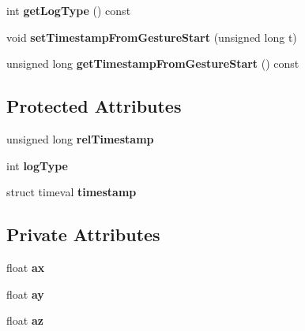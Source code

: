 \begin{DoxyCompactItemize}
\item 
\hypertarget{class_sample_aafff0e8223f3eafa001611a63f194c8a}{int {\bfseries get\-Log\-Type} () const }\label{class_sample_aafff0e8223f3eafa001611a63f194c8a}

\item 
\hypertarget{class_sample_a05edd06782fa94517b8daeb29e12057d}{void {\bfseries set\-Timestamp\-From\-Gesture\-Start} (unsigned long t)}\label{class_sample_a05edd06782fa94517b8daeb29e12057d}

\item 
\hypertarget{class_sample_a94a34fe92c0f8a89485042aaea458d94}{unsigned long {\bfseries get\-Timestamp\-From\-Gesture\-Start} () const }\label{class_sample_a94a34fe92c0f8a89485042aaea458d94}

\end{DoxyCompactItemize}
\subsection*{Protected Attributes}
\begin{DoxyCompactItemize}
\item 
\hypertarget{class_sample_a24ea733ab0a815949a57aca2a4740e33}{unsigned long {\bfseries rel\-Timestamp}}\label{class_sample_a24ea733ab0a815949a57aca2a4740e33}

\item 
\hypertarget{class_sample_a3a6454628c790459f41de5c83bf3ec7c}{int {\bfseries log\-Type}}\label{class_sample_a3a6454628c790459f41de5c83bf3ec7c}

\item 
\hypertarget{class_sample_adbde42442423cd9dc8d971bf764391cc}{struct timeval {\bfseries timestamp}}\label{class_sample_adbde42442423cd9dc8d971bf764391cc}

\end{DoxyCompactItemize}
\subsection*{Private Attributes}
\begin{DoxyCompactItemize}
\item 
\hypertarget{class_acc_sample_a0971152a4b39e44f004fb3d617c0a285}{float {\bfseries ax}}\label{class_acc_sample_a0971152a4b39e44f004fb3d617c0a285}

\item 
\hypertarget{class_acc_sample_a1fd5b59dc902551e02efc4fe2c83695e}{float {\bfseries ay}}\label{class_acc_sample_a1fd5b59dc902551e02efc4fe2c83695e}

\item 
\hypertarget{class_acc_sample_a332097e8c2743fa40a586a50efdb7efe}{float {\bfseries az}}\label{class_acc_sample_a332097e8c2743fa40a586a50efdb7efe}

\end{DoxyCompactItemize}


